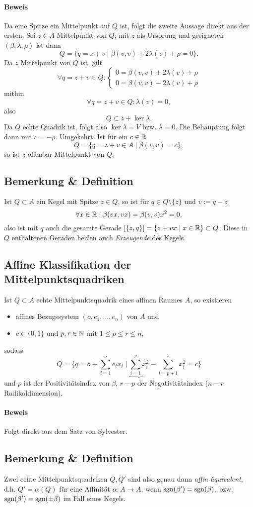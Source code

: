 \paragraph{Beweis}
	Da eine Spitze ein Mittelpunkt auf $ Q $ ist, folgt die zweite Aussage direkt aus der ersten.
	Sei $ z\in A $ Mittelpunkt von $ Q $; mit $ z $ als Ursprung und geeigneten $ (\beta,\lambda,\rho) $ ist dann
		\[ Q=\{q=z+v\mid \beta(v,v)+2\lambda(v)+\rho = 0\}. \]
	Da $ z $ Mittelpunkt von $ Q $ ist, gilt
		\[ \forall q=z+v\in Q: \begin{cases}
		0 = \beta(v,v)+2\lambda(v)+\rho\\
		0 = \beta(v,v)-2\lambda(v)+\rho
		\end{cases} \]
	mithin
		\[ \forall q=z+v\in Q: \lambda(v) = 0, \]
	also 
		\[ Q\subset z +\ker \lambda. \]
	Da $ Q $ echte Quadrik ist, folgt also $ \ker \lambda = V $ bzw. $ \lambda = 0 $. Die Behauptung folgt dann mit $ c=-\rho $. Umgekehrt: Ist für ein $ c\in \mathbb{R} $
		\[ Q=\{q=z+v\in A\mid \beta(v,v)=c \}, \]
	so ist $ z $ offenbar Mittelpunkt von $ Q $.
\subsection{Bemerkung \& Definition}
	Ist $ Q\subset A $ ein Kegel mit Spitze $ z\in Q $, so ist für $ q\in Q\setminus\{z\} $ und $ v:= q-z $
		\[ \forall x\in \mathbb{R}: \beta(vx,vx)= \beta(v,v)x^2 = 0,  \]
	also ist mit $ q $ auch die gesamte Gerade $ [\{z,q\}] = \{z+vx\mid x\in \mathbb{R}\}\subset Q $. Diese in $ Q $ enthaltenen Geraden heißen auch \emph{Erzeugende} des Kegels.
\subsection{Affine Klassifikation der Mittelpunktsquadriken}
	Ist $ Q\subset A $ echte Mittelpunktsquadrik eines affinen Raumes $ A $, so existieren
	\begin{itemize}
		\item affines Bezugssystem $ (o,e_1,\dots,e_n) $ von $ A $ und
		\item $ c\in \{0,1\} $ und $ p,r\in \mathbb{N} $ mit $ 1\leq p\leq r \leq n $, 
	\end{itemize}
	sodass 
		\[ Q=\{q=o+\sum_{i=1}^{n}e_ix_i\mid \underbrace{\sum_{i=1}^{p}x_i^2}-\sum_{i=p+1}^{r}x_i^2 = c \} \]
	und $ p $ ist der Positivitätsindex von $ \beta $, $ r-p $ der Negativitätsindex ($ n-r $ Radikaldimension). 
\paragraph{Beweis}
	Folgt direkt aus dem Satz von Sylvester.
\subsection{Bemerkung \& Definition}
	Zwei echte Mittelpunktsquadriken $ Q,Q' $ sind also genau dann \emph{affin äquivalent}, d.h. $ Q' = \alpha(Q) $ für eine Affinität $ \alpha:A\to A $, wenn $ \operatorname{sgn}(\beta')=\operatorname{sgn}(\beta) $, bzw. $ \operatorname{sgn}(\beta')=\operatorname{sgn}(\pm \beta) $ im Fall eines Kegels.